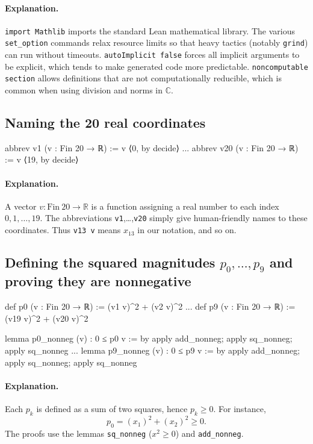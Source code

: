 \documentclass[11pt]{article}
\begin{document}
\paragraph{Explanation.}
\texttt{import Mathlib} imports the standard Lean mathematical library.
The various \texttt{set\_option} commands relax resource limits so that heavy tactics (notably \texttt{grind}) can run without timeouts.
\texttt{autoImplicit false} forces all implicit arguments to be explicit, which tends to make generated code more predictable.
\texttt{noncomputable section} allows definitions that are not computationally reducible, which is common when using division and norms in $\mathbb{C}$.

\subsection*{Naming the 20 real coordinates}

\begin{LeanCode}
abbrev v1 (v : Fin 20 → ℝ) := v ⟨0, by decide⟩
...
abbrev v20 (v : Fin 20 → ℝ) := v ⟨19, by decide⟩
\end{LeanCode}

\paragraph{Explanation.}
A vector $v:\mathrm{Fin}\ 20\to\mathbb{R}$ is a function assigning a real number to each index $0,1,\dots,19$.
The abbreviations \texttt{v1},\dots,\texttt{v20} simply give human-friendly names to these coordinates.
Thus \texttt{v13 v} means $x_{13}$ in our notation, and so on.

\subsection*{Defining the squared magnitudes $p_0,\dots,p_9$ and proving they are nonnegative}

\begin{LeanCode}
def p0 (v : Fin 20 → ℝ) := (v1 v)^2 + (v2 v)^2
...
def p9 (v : Fin 20 → ℝ) := (v19 v)^2 + (v20 v)^2

lemma p0_nonneg (v) : 0 ≤ p0 v := by
  apply add_nonneg; apply sq_nonneg; apply sq_nonneg
...
lemma p9_nonneg (v) : 0 ≤ p9 v := by
  apply add_nonneg; apply sq_nonneg; apply sq_nonneg
\end{LeanCode}

\paragraph{Explanation.}
Each $p_k$ is defined as a sum of two squares, hence $p_k\ge 0$.
For instance,
\[
p_0=(x_1)^2+(x_2)^2\ge 0.
\]
The proofs use the lemmas \texttt{sq\_nonneg} ($x^2\ge 0$) and \texttt{add\_nonneg}.
\end{document}
